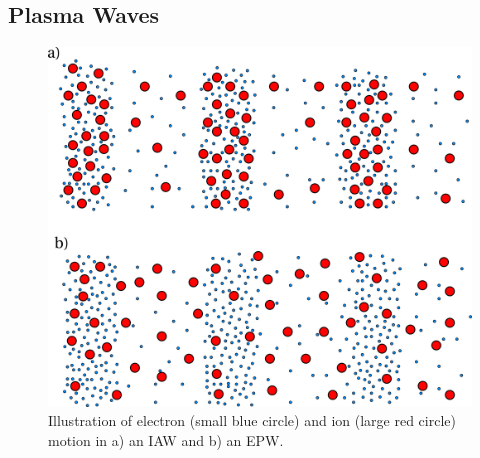 \subsection{Plasma Waves}%
\label{sec:theory_longwaves}

\begin{figure}[t!]
    \includegraphics[width=0.7\linewidth]{Theory/Images/IAW_EPW.png}
    \centering
    \caption{Illustration of electron (small blue circle) and ion (large red circle) motion in a) an \ac{IAW} and b) an \ac{EPW}.}%
    \label{fig:theory_IAW_EPW}
\end{figure}

